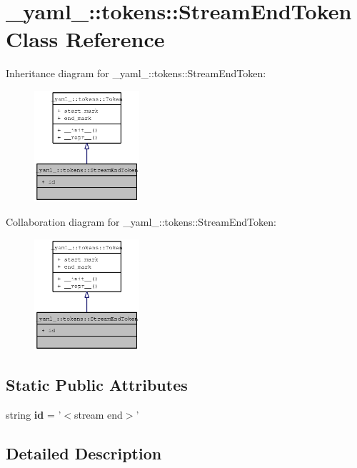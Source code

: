 \section{\_\-yaml\_\-::tokens::StreamEndToken Class Reference}
\label{class__yaml___1_1tokens_1_1StreamEndToken}
Inheritance diagram for \_\-yaml\_\-::tokens::StreamEndToken:\nopagebreak
\begin{figure}[H]
\begin{center}
\leavevmode
\includegraphics[width=110pt]{class__yaml___1_1tokens_1_1StreamEndToken__inherit__graph}
\end{center}
\end{figure}
Collaboration diagram for \_\-yaml\_\-::tokens::StreamEndToken:\nopagebreak
\begin{figure}[H]
\begin{center}
\leavevmode
\includegraphics[width=110pt]{class__yaml___1_1tokens_1_1StreamEndToken__coll__graph}
\end{center}
\end{figure}
\subsection*{Static Public Attributes}
\begin{CompactItemize}
\item 
string {\bf id} = '$<$stream end$>$'
\end{CompactItemize}


\subsection{Detailed Description}


